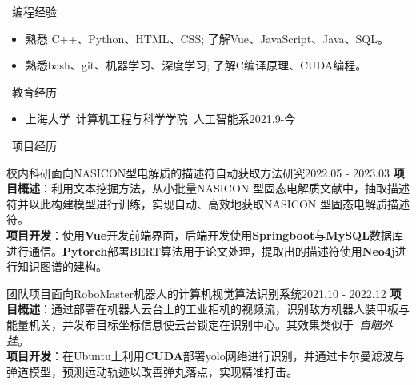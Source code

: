 \documentclass[UTF8]{resume}
\begin{document}
  
\begin{rSection}{\faCogs~编程经验}
    \begin{itemize}
        \itemsep -0.5em
        \item 熟悉 C++、Python、HTML、CSS; 了解Vue、JavaScript、Java、SQL。
        \item 熟悉bash、git、机器学习、深度学习; 了解C编译原理、CUDA编程。
    \end{itemize} 
\end{rSection}

\begin{rSection}{\faGraduationCap~教育经历}
    \begin{itemize}
        \item 上海大学~计算机工程与科学学院~人工智能系\hfill 2021.9-今
    \end{itemize}
\end{rSection}
 

\begin{rSection}{\faUsers~项目经历}

    \begin{rProject}{校内科研}{面向NASICON型电解质的描述符自动获取方法研究}{2022.05 - 2023.03}
        \textbf{项目概述}：利用文本挖掘方法，从小批量NASICON 型固态电解质文献中，抽取描述符并以此构建模型进行训练，实现自动、高效地获取NASICON 型固态电解质描述符。\\
        \textbf{项目开发}：使用\textbf{Vue}开发前端界面，后端开发使用\textbf{Springboot}与\textbf{MySQL}数据库进行通信。\textbf{Pytorch}部署BERT算法用于论文处理，提取出的描述符使用\textbf{Neo4j}进行知识图谱的建构。
    \end{rProject}

    \begin{rProject}{团队项目}{面向RoboMaster机器人的计算机视觉算法识别系统}{2021.10 - 2022.12}
        \textbf{项目概述}：通过部署在机器人云台上的工业相机的视频流，识别敌方机器人装甲板与能量机关，并发布目标坐标信息使云台锁定在识别中心。其效果类似于~\textit{自瞄外挂}。\\
        \textbf{项目开发}：在Ubuntu上利用\textbf{CUDA}部署yolo网络进行识别，并通过卡尔曼滤波与弹道模型，预测运动轨迹以改善弹丸落点，实现精准打击。
    \end{rProject}

\end{rSection}
\end{document}
